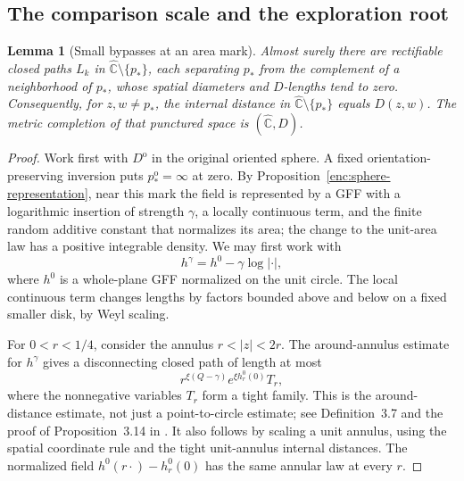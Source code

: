 \documentclass[11pt]{article}
\numberwithin{equation}{section}
\newtheorem{lemma}[theorem]{Lemma}
\theoremstyle{definition}
\theoremstyle{remark}
\newcommand{\Chat}{\widehat{\mathbb C}}
\newcommand{\1}{\mathbf 1}
\begin{document}
\subsection{The comparison scale and the exploration root}

\begin{lemma}[Small bypasses at an area mark]
\label{comp:root-bypass}
Almost surely there are rectifiable closed paths $L_k$ in
$\Chat\setminus\{p_*\}$, each separating $p_*$ from the complement of
a neighborhood of $p_*$, whose spatial diameters and $D$-lengths tend
to zero.  Consequently, for $z,w\ne p_*$, the internal distance in
$\Chat\setminus\{p_*\}$ equals $D(z,w)$.  The metric completion of
that punctured space is $(\Chat,D)$.
\end{lemma}

\begin{proof}
Work first with $D^{\mathrm o}$ in the original oriented sphere.
A fixed orientation-preserving inversion puts
$p_*^{\mathrm o}=\infty$ at zero.  By
Proposition~\ref{enc:sphere-representation}, near this mark the field
is represented by a GFF with a logarithmic insertion of strength
$\gamma$, a locally continuous term, and the finite random additive
constant that normalizes its area; the change to the unit-area law
has a positive integrable density.  We may first work with
\[
 h^\gamma=h^0-\gamma\log|\cdot|,
\]
where $h^0$ is a whole-plane GFF normalized on the unit circle.
The local continuous term changes lengths by factors bounded above
and below on a fixed smaller disk, by Weyl scaling.

For $0<r<1/4$, consider the annulus $r<|z|<2r$.  The
around-annulus estimate for $h^\gamma$ gives a disconnecting closed
path of length at most
\begin{equation}
 \label{comp:root-annulus-bound}
 r^{\xi(Q-\gamma)}e^{\xi h^0_r(0)}T_r,
\end{equation}
where the nonnegative variables $T_r$ form a tight family.  This is
the around-distance estimate, not just a point-to-circle estimate;
see Definition~3.7 and the proof of Proposition~3.14 in
\cite{DubedatEtAlWeakMetric}.  It also follows by scaling a unit annulus, using
the spatial coordinate rule and the tight unit-annulus internal
distances.  The normalized field
$h^0(r\cdot)-h^0_r(0)$ has the same annular law at every $r$.


\end{proof}
\end{document}
